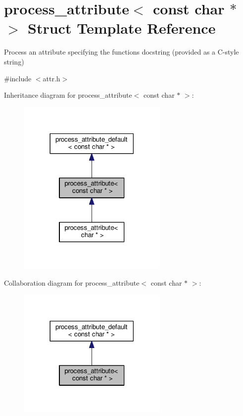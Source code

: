 \hypertarget{structprocess__attribute_3_01const_01char_01_5_01_4}{}\section{process\+\_\+attribute$<$ const char $\ast$ $>$ Struct Template Reference}
\label{structprocess__attribute_3_01const_01char_01_5_01_4}


Process an attribute specifying the function\textquotesingle{}s docstring (provided as a C-\/style string)  




{\ttfamily \#include $<$attr.\+h$>$}



Inheritance diagram for process\+\_\+attribute$<$ const char $\ast$ $>$\+:
\nopagebreak
\begin{figure}[H]
\begin{center}
\leavevmode
\includegraphics[width=206pt]{structprocess__attribute_3_01const_01char_01_5_01_4__inherit__graph}
\end{center}
\end{figure}


Collaboration diagram for process\+\_\+attribute$<$ const char $\ast$ $>$\+:
\nopagebreak
\begin{figure}[H]
\begin{center}
\leavevmode
\includegraphics[width=206pt]{structprocess__attribute_3_01const_01char_01_5_01_4__coll__graph}
\end{center}
\end{figure}
